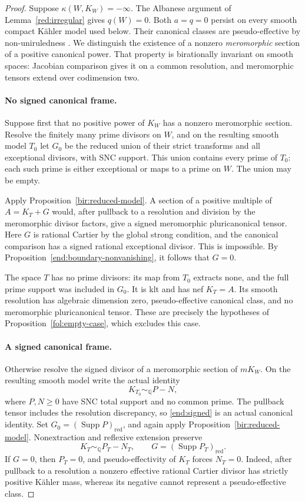\documentclass[11pt,letterpaper]{article}
\newcommand{\Q}{\mathbb{Q}}
\DeclareMathOperator{\Supp}{Supp}
\theoremstyle{definition}
\theoremstyle{remark}
\begin{document}
\begin{proof}
Suppose \(\kappa(W,K_W)=-\infty\). The Albanese argument
of Lemma~\ref{red:irregular} gives \(q(W)=0\). Both
\(a=q=0\) persist on every smooth compact K\"ahler model used
below. Their canonical classes are pseudo-effective by
non-uniruledness \cite{OuUniruledness}. We distinguish the existence
of a nonzero \emph{meromorphic} section of a positive canonical
power. That property is birationally invariant on smooth spaces:
Jacobian comparison gives it on a common resolution, and
meromorphic tensors extend over codimension two.

\paragraph{No signed canonical frame.}
Suppose first that no positive power of \(K_W\) has a nonzero
meromorphic section. Resolve the finitely many prime divisors on
\(W\), and on the resulting smooth model \(T_0\) let \(G_0\)
be the reduced union of their strict transforms and all exceptional
divisors, with SNC support. This union contains every prime of
\(T_0\): each such prime is either exceptional or maps to a prime
on \(W\). The union may be empty.

Apply Proposition~\ref{bir:reduced-model}. A section of a positive
multiple of \(A=K_T+G\) would, after pullback to a resolution and
division by the meromorphic divisor factors, give a signed
meromorphic pluricanonical tensor. Here \(G\) is rational Cartier
by the global strong condition, and the canonical comparison has a
signed rational exceptional divisor. This is impossible. By
Proposition~\ref{end:boundary-nonvanishing}, it follows that
\(G=0\).

The space \(T\) has no prime divisors: its map from \(T_0\)
extracts none, and the full prime support was included in \(G_0\).
It is klt and has nef \(K_T=A\). Its smooth resolution has
algebraic dimension zero, pseudo-effective canonical class, and no
meromorphic pluricanonical tensor. These are precisely the
hypotheses of Proposition~\ref{fol:empty-case}, which excludes this case.

\paragraph{A signed canonical frame.}
Otherwise resolve the signed divisor of a meromorphic section of
\(mK_W\). On the resulting smooth model write the actual identity
\begin{equation}\label{end:signed}
 K_{T_0}\sim_{\Q}P-N,
\end{equation}
where \(P,N\ge0\) have SNC total support and no common prime.
The pullback tensor includes the resolution discrepancy, so
\eqref{end:signed} is an actual canonical identity. Set
\(G_0=(\Supp P)_{\mathrm{red}}\), and again apply
Proposition~\ref{bir:reduced-model}. Nonextraction and reflexive
extension preserve
\[
 K_T\sim_{\Q}P_T-N_T,
 \qquad G=(\Supp P_T)_{\mathrm{red}}.
\]
If \(G=0\), then \(P_T=0\), and pseudo-effectivity of \(K_T\)
forces \(N_T=0\). Indeed, after pullback to a resolution a
nonzero effective rational Cartier divisor has strictly positive
K\"ahler mass, whereas its negative cannot represent a
pseudo-effective class.


\end{proof}
\end{document}
